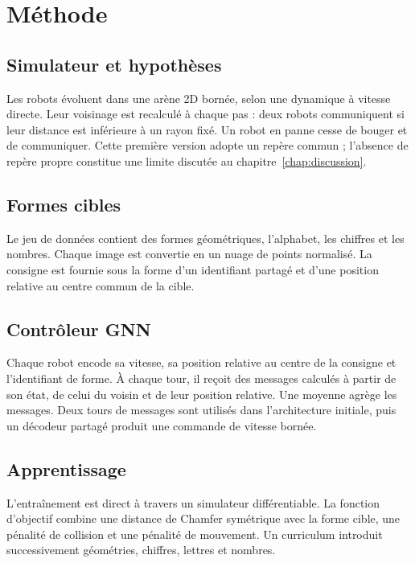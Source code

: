 \chapter{Méthode}
\label{chap:methode}

\section{Simulateur et hypothèses}
Les robots évoluent dans une arène 2D bornée, selon une dynamique à vitesse directe. Leur voisinage est recalculé à chaque pas : deux robots communiquent si leur distance est inférieure à un rayon fixé. Un robot en panne cesse de bouger et de communiquer. Cette première version adopte un repère commun ; l'absence de repère propre constitue une limite discutée au chapitre~\ref{chap:discussion}.

\section{Formes cibles}
Le jeu de données contient des formes géométriques, l'alphabet, les chiffres et les nombres. Chaque image est convertie en un nuage de points normalisé. La consigne est fournie sous la forme d'un identifiant partagé et d'une position relative au centre commun de la cible.

\section{Contrôleur GNN}
Chaque robot encode sa vitesse, sa position relative au centre de la consigne et l'identifiant de forme. À chaque tour, il reçoit des messages calculés à partir de son état, de celui du voisin et de leur position relative. Une moyenne agrège les messages. Deux tours de messages sont utilisés dans l'architecture initiale, puis un décodeur partagé produit une commande de vitesse bornée.

\section{Apprentissage}
L'entraînement est direct à travers un simulateur différentiable. La fonction d'objectif combine une distance de Chamfer symétrique avec la forme cible, une pénalité de collision et une pénalité de mouvement. Un curriculum introduit successivement géométries, chiffres, lettres et nombres.
